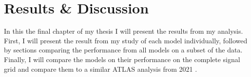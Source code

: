 \chapter{Results \& Discussion}\label{subsec:ResDisc}
In this the final chapter of my thesis I will present the results from my analysis. First,
I will present the result from my study of each model individually, followed by sections 
comparing the performance from all models on a subset of the data. Finally, I will compare 
the models on their performance on the complete signal grid and compare them to a similar \ac{ATLAS} 
analysis from 2021 \cite{atlas_search_2021}.

